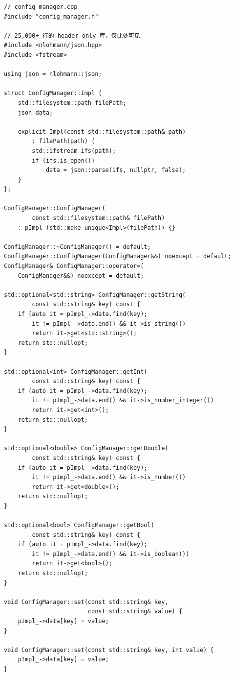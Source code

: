 \documentclass[12pt,a4paper,fontset=fandol]{ctexbook}
\begin{document}
\begin{lstlisting}[caption={配置管理器——实现文件隔离 JSON 库}]
// config_manager.cpp
#include "config_manager.h"

// 25,000+ 行的 header-only 库，仅此处可见
#include <nlohmann/json.hpp>
#include <fstream>

using json = nlohmann::json;

struct ConfigManager::Impl {
    std::filesystem::path filePath;
    json data;

    explicit Impl(const std::filesystem::path& path)
        : filePath(path) {
        std::ifstream ifs(path);
        if (ifs.is_open())
            data = json::parse(ifs, nullptr, false);
    }
};

ConfigManager::ConfigManager(
        const std::filesystem::path& filePath)
    : pImpl_(std::make_unique<Impl>(filePath)) {}

ConfigManager::~ConfigManager() = default;
ConfigManager::ConfigManager(ConfigManager&&) noexcept = default;
ConfigManager& ConfigManager::operator=(
    ConfigManager&&) noexcept = default;

std::optional<std::string> ConfigManager::getString(
        const std::string& key) const {
    if (auto it = pImpl_->data.find(key);
        it != pImpl_->data.end() && it->is_string())
        return it->get<std::string>();
    return std::nullopt;
}

std::optional<int> ConfigManager::getInt(
        const std::string& key) const {
    if (auto it = pImpl_->data.find(key);
        it != pImpl_->data.end() && it->is_number_integer())
        return it->get<int>();
    return std::nullopt;
}

std::optional<double> ConfigManager::getDouble(
        const std::string& key) const {
    if (auto it = pImpl_->data.find(key);
        it != pImpl_->data.end() && it->is_number())
        return it->get<double>();
    return std::nullopt;
}

std::optional<bool> ConfigManager::getBool(
        const std::string& key) const {
    if (auto it = pImpl_->data.find(key);
        it != pImpl_->data.end() && it->is_boolean())
        return it->get<bool>();
    return std::nullopt;
}

void ConfigManager::set(const std::string& key,
                        const std::string& value) {
    pImpl_->data[key] = value;
}

void ConfigManager::set(const std::string& key, int value) {
    pImpl_->data[key] = value;
}


\end{lstlisting}
\end{document}
